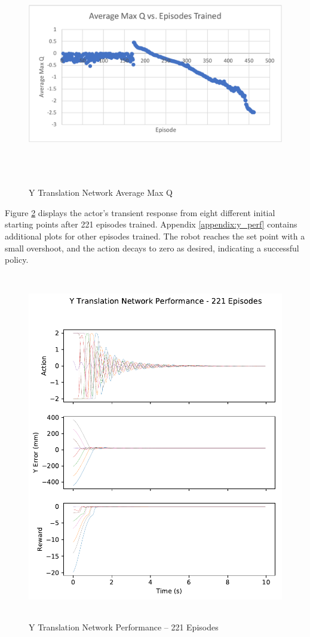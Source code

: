 \begin{figure}[H]
	\centering
	\includegraphics[width=6in, height=3.85in, keepaspectratio]{figures/train_figs/y_q.pdf}
	\caption{Y Translation Network Average Max Q} \label{fig:y_q}
\end{figure}

Figure \ref{fig:y_perf} displays the actor's transient response from eight different initial starting points after 221 episodes trained. Appendix \ref{appendix:y_perf} contains additional plots for other episodes trained. The robot reaches the set point with a small overshoot, and the action decays to zero as desired, indicating a successful policy.
\begin{figure}[H]
	\centering
	\includegraphics[width=6in, height=6in, keepaspectratio]{figures/train_figs/transy_transitions/2_221.pdf}
	\caption{Y Translation Network Performance -- 221 Episodes}\label{fig:y_perf}
\end{figure}

